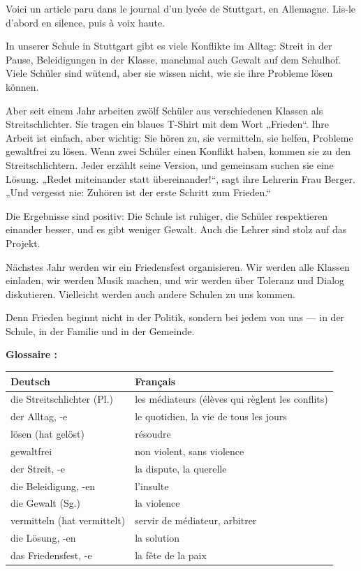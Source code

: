 \documentclass[11pt]{article}
\newcounter{popsec}
\newcounter{popsub}
\newcommand{\courssub}[1]{%
  \stepcounter{popsub}%
  \par\vspace{9pt}\noindent{\popxbold\fontsize{11.5}{13}\selectfont\color{popink}{\color{poporange}\thepopsec.\thepopsub}\hspace{6pt}#1}\par\nopagebreak\vspace{4pt}
}
\begin{document}
\courssub{Le texte : Frieden beginnt bei uns}

Voici un article paru dans le journal d'un lycée de Stuttgart, en Allemagne. Lis-le d'abord en silence, puis à voix haute.

\begin{textebox}
In unserer Schule in Stuttgart gibt es viele Konflikte im Alltag: Streit in der Pause, Beleidigungen in der Klasse, manchmal auch Gewalt auf dem Schulhof. Viele Schüler sind wütend, aber sie wissen nicht, wie sie ihre Probleme lösen können.

Aber seit einem Jahr arbeiten zwölf Schüler aus verschiedenen Klassen als Streitschlichter. Sie tragen ein blaues T-Shirt mit dem Wort „Frieden“. Ihre Arbeit ist einfach, aber wichtig: Sie hören zu, sie vermitteln, sie helfen, Probleme gewaltfrei zu lösen. Wenn zwei Schüler einen Konflikt haben, kommen sie zu den Streitschlichtern. Jeder erzählt seine Version, und gemeinsam suchen sie eine Lösung. „Redet miteinander statt übereinander!“, sagt ihre Lehrerin Frau Berger. „Und vergesst nie: Zuhören ist der erste Schritt zum Frieden.“

Die Ergebnisse sind positiv: Die Schule ist ruhiger, die Schüler respektieren einander besser, und es gibt weniger Gewalt. Auch die Lehrer sind stolz auf das Projekt.

Nächstes Jahr werden wir ein Friedensfest organisieren. Wir werden alle Klassen einladen, wir werden Musik machen, und wir werden über Toleranz und Dialog diskutieren. Vielleicht werden auch andere Schulen zu uns kommen.

Denn Frieden beginnt nicht in der Politik, sondern bei jedem von uns — in der Schule, in der Familie und in der Gemeinde.
\end{textebox}

\textbf{Glossaire :}

\begin{center}
\begin{tabularx}{\linewidth}{|X|X|}\hline
\rowcolor{popblueL} \textbf{Deutsch} & \textbf{Français} \\ \hline
die Streitschlichter (Pl.) & les médiateurs (élèves qui règlent les conflits) \\ \hline
der Alltag, -e & le quotidien, la vie de tous les jours \\ \hline
lösen (hat gelöst) & résoudre \\ \hline
gewaltfrei & non violent, sans violence \\ \hline
der Streit, -e & la dispute, la querelle \\ \hline
die Beleidigung, -en & l'insulte \\ \hline
die Gewalt (Sg.) & la violence \\ \hline
vermitteln (hat vermittelt) & servir de médiateur, arbitrer \\ \hline
die Lösung, -en & la solution \\ \hline
das Friedensfest, -e & la fête de la paix \\ \hline
\end{tabularx}
\end{center}
\end{document}
